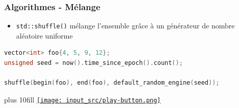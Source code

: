 \documentclass[C++.tex]{subfiles}
\begin{document}
\begin{frame}[fragile]
	\frametitle{Algorithmes - Mélange}
	\begin{itemize}
		\item \lstinline|std::shuffle()| mélange l'ensemble grâce à un générateur de nombre aléatoire \og uniforme\fg{}
	\end{itemize}

	\begin{lstlisting}[language=C++]
vector<int> foo{4, 5, 9, 12};
unsigned seed = now().time_since_epoch().count();

shuffle(begin(foo), end(foo), default_random_engine(seed));\end{lstlisting}


	\vskip 10mm plus 10fill
	\hfill
	\href{https://godbolt.org/#g:!((g:!((g:!((h:codeEditor,i:(filename:'1',fontScale:14,fontUsePx:'0',j:1,lang:c%2B%2B,selection:(endColumn:1,endLineNumber:22,positionColumn:1,positionLineNumber:22,selectionStartColumn:1,selectionStartLineNumber:22,startColumn:1,startLineNumber:22),source:'%23include+%3Ciostream%3E%0A%23include+%3Cvector%3E%0A%23include+%3Calgorithm%3E%0A%23include+%3Cchrono%3E%0A%23include+%3Crandom%3E%0A%0Ausing+std::begin%3B%0Ausing+std::end%3B%0A%0Aint+main()%0A%7B%0A++std::vector%3Cint%3E+foo%7B4,+5,+9,+12%7D%3B%0A++unsigned+seed+%3D+std::chrono::system_clock::now().time_since_epoch().count()%3B%0A%0A++std::shuffle(begin(foo),+end(foo),+std::default_random_engine(seed))%3B%0A++for(size_t+i+%3D+0%3B+i+%3C+foo.size()%3B+%2B%2Bi)%0A++%7B%0A++++std::cout+%3C%3C+foo%5Bi%5D+%3C%3C+!'+!'%3B%0A++%7D%0A++std::cout+%3C%3C+!'%5Cn!'%3B%0A%7D%0A'),l:'5',n:'0',o:'C%2B%2B+source+%231',t:'0')),k:50,l:'4',n:'0',o:'',s:0,t:'0'),(g:!((h:executor,i:(argsPanelShown:'1',compilationPanelShown:'0',compiler:g112,compilerOutShown:'0',execArgs:'',execStdin:'',fontScale:14,fontUsePx:'0',j:1,lang:c%2B%2B,libs:!((name:boost,ver:'175')),options:'-std%3Dc%2B%2B11',source:1,stdinPanelShown:'1',tree:'1',wrap:'0'),l:'5',n:'0',o:'Executor+x86-64+gcc+11.2+(C%2B%2B,+Editor+%231)',t:'0')),header:(),k:50,l:'4',n:'0',o:'',s:0,t:'0')),l:'2',n:'0',o:'',t:'0')),version:4}{\texttt{[image: input\_src/play-button.png]}}
\end{frame}
\end{document}

